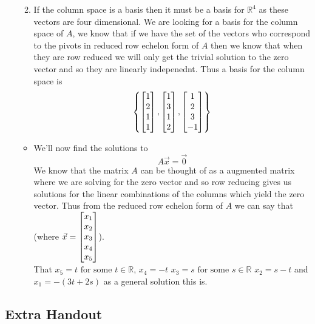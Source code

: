 \documentclass[11pt]{book}
\begin{document}
\begin{ex}
\begin{itemize}
\begin{enumerate}
\[                    \]
                \item If the column space is a basis then it must be a basis for $\mathbb{R}^{4}$ as these vectors are four dimensional. We are looking for a basis for the column space of $A$, we know that if we have the set of the vectors who correspond to the pivots in reduced row echelon form of $A$ then we know that when they are row reduced we will only get the trivial solution to the zero vector and so they are linearly indepenednt. Thus a basis for the column space is
                    \[
                    \left\{ \begin{bmatrix} 1 \\ 2 \\ 1 \\ 1 \end{bmatrix} , \begin{bmatrix} 1 \\ 3 \\ 1 \\ 2 \end{bmatrix} , \begin{bmatrix} 1 \\ 2 \\ 3 \\ -1 \end{bmatrix}  \right\} 
                    \]
            \end{enumerate}
        \begin{itemize}
            \item We'll now find the solutions to 
                \[
                A\vec{x} = \vec{0} 
                \]
                We know that the matrix $A$ can be thought of as a augmented matrix where we are solving for the zero vector and so row reducing gives us solutions for the linear combinations of the columns which yield the zero vector. Thus from the reduced row echelon form of $A$ we can say that (where $\vec{x} = \begin{bmatrix} x_1 \\ x_2 \\ x_3 \\ x_4 \\ x_5 \end{bmatrix} $). \\
                That $x_5= t \text{ for some  } t \in \mathbb{R} $,  $x_4= -t$ $x_3= s \text{ for some  } s \in \mathbb{R} $ $x_2= s - t$ and $x_1=  - \left( 3t  + 2s \right) $ as a general solution this is.
        \end{itemize}
    \end{itemize}
\end{ex}


\subsection{Extra Handout}%
\label{sub:extra_handout}
\end{document}
